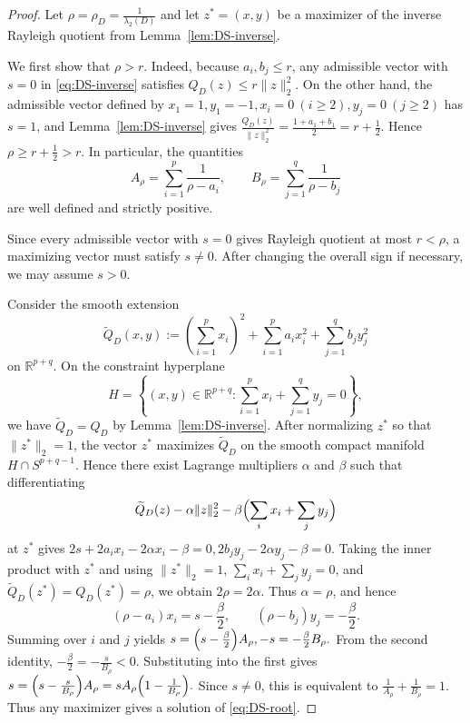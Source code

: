 \documentclass[11pt]{article}
\theoremstyle{remark}
\begin{document}
\begin{proof}
Let
$\rho=\rho_D=\frac{1}{\lambda_2(D)}$
and let $z^\ast=(x,y)$ be a maximizer of the inverse Rayleigh quotient from
Lemma~\ref{lem:DS-inverse}.

We first show that $\rho>r$.
Indeed, because $a_i,b_j\le r$, any admissible vector with $s=0$ in
\eqref{eq:DS-inverse} satisfies
$Q_D(z)\le r\|z\|_2^2.$
On the other hand, the admissible vector defined by
$x_1=1, y_1=-1, x_i=0\ (i\ge2), y_j=0\ (j\ge2)$
has $s=1$, and Lemma~\ref{lem:DS-inverse} gives
$\frac{Q_D(z)}{\|z\|_2^2} = \frac{1+a_1+b_1}{2} = r+\frac12.$
Hence
$\rho\ge r+\frac12>r.$
In particular, the quantities
$$
A_\rho=\sum_{i=1}^p\frac1{\rho-a_i},
\qquad
B_\rho=\sum_{j=1}^q\frac1{\rho-b_j}
$$
are well defined and strictly positive.

Since every admissible vector with $s=0$ gives Rayleigh quotient at most $r<\rho$, a maximizing
vector must satisfy $s\ne 0$.
After changing the overall sign if necessary, we may assume $s>0$.

Consider the smooth extension
$$
\widetilde Q_D(x,y):=\left(\sum_{i=1}^p x_i\right)^2+
\sum_{i=1}^p a_i x_i^2+
\sum_{j=1}^q b_j y_j^2
$$
on $\mathbb{R}^{p+q}$.
On the constraint hyperplane
$$
H=\left\{(x,y)\in\mathbb{R}^{p+q}:\sum_{i=1}^p x_i+\sum_{j=1}^q y_j=0\right\},
$$
we have $\widetilde Q_D=Q_D$ by Lemma~\ref{lem:DS-inverse}.
After normalizing $z^\ast$ so that $\|z^\ast\|_2=1$, the vector $z^\ast$ maximizes
$\widetilde Q_D$ on the smooth compact manifold $H\cap S^{p+q-1}$.
Hence there exist Lagrange multipliers $\alpha$ and $\beta$ such that differentiating
$$
\widetilde Q_D(z)-\alpha\|z\|_2^2-\beta\Bigl(\sum_i x_i+\sum_j y_j\Bigr)
$$
at $z^\ast$ gives
$2s+2a_i x_i-2\alpha x_i-\beta=0, 2b_j y_j-2\alpha y_j-\beta=0.$
Taking the inner product with $z^\ast$ and using $\|z^\ast\|_2=1$,
$\sum_i x_i+\sum_j y_j=0$, and $\widetilde Q_D(z^\ast)=Q_D(z^\ast)=\rho$, we obtain
$2\rho=2\alpha.$
Thus $\alpha=\rho$, and hence
\begin{equation}\label{eq:lmult-DS}
(\rho-a_i)x_i=s-\frac{\beta}{2},
\qquad
(\rho-b_j)y_j=-\frac{\beta}{2}.
\end{equation}
Summing over $i$ and $j$ yields
$s=\Bigl(s-\frac{\beta}{2}\Bigr)A_\rho, -s=-\frac{\beta}{2}B_\rho.$
From the second identity,
$-\frac{\beta}{2}=-\frac{s}{B_\rho}<0.$
Substituting into the first gives
$s=\Bigl(s-\frac{s}{B_\rho}\Bigr)A_\rho =sA_\rho\Bigl(1-\frac1{B_\rho}\Bigr).$
Since $s\ne0$, this is equivalent to
$\frac1{A_\rho}+\frac1{B_\rho}=1.$
Thus any maximizer gives a solution of \eqref{eq:DS-root}.


\end{proof}
\end{document}
